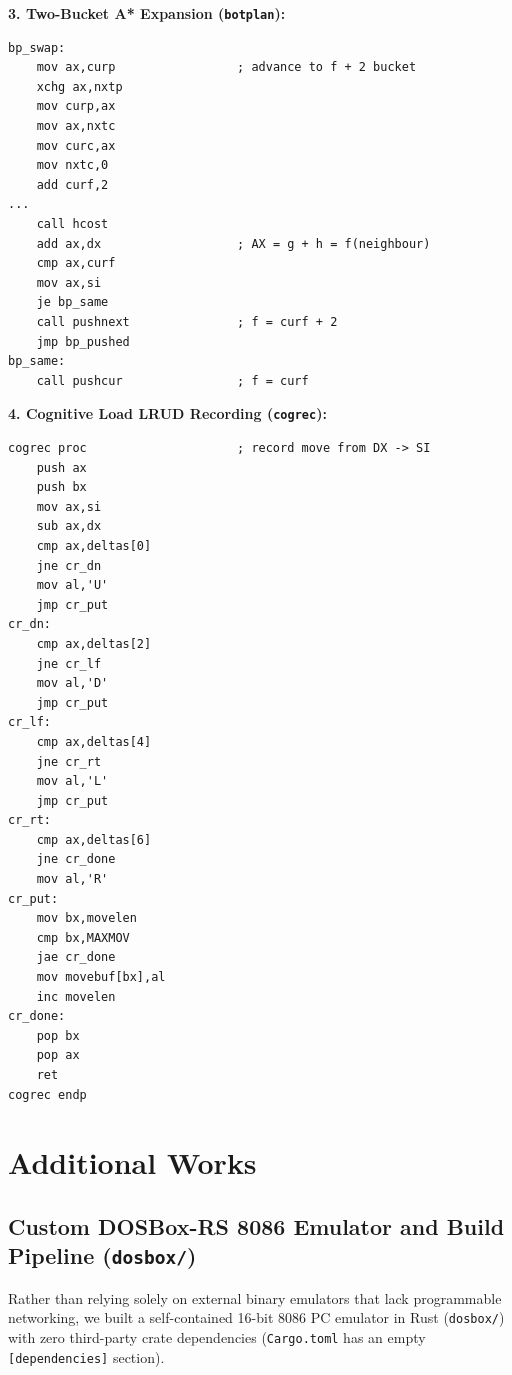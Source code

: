 \documentclass[11pt,a4paper]{article}
\begin{document}
\textbf{3. Two-Bucket A* Expansion (\texttt{botplan}):}
\begin{lstlisting}[caption={Bucket swap and $f / f+2$ neighbor insertion in \texttt{botplan}.}]
bp_swap:
    mov ax,curp                 ; advance to f + 2 bucket
    xchg ax,nxtp
    mov curp,ax
    mov ax,nxtc
    mov curc,ax
    mov nxtc,0
    add curf,2
...
    call hcost
    add ax,dx                   ; AX = g + h = f(neighbour)
    cmp ax,curf
    mov ax,si
    je bp_same
    call pushnext               ; f = curf + 2
    jmp bp_pushed
bp_same:
    call pushcur                ; f = curf
\end{lstlisting}

\textbf{4. Cognitive Load LRUD Recording (\texttt{cogrec}):}
\begin{lstlisting}[caption={Capturing directional moves (\texttt{U/D/L/R}) in cognitive study mode.}]
cogrec proc                     ; record move from DX -> SI
    push ax
    push bx
    mov ax,si
    sub ax,dx
    cmp ax,deltas[0]
    jne cr_dn
    mov al,'U'
    jmp cr_put
cr_dn:
    cmp ax,deltas[2]
    jne cr_lf
    mov al,'D'
    jmp cr_put
cr_lf:
    cmp ax,deltas[4]
    jne cr_rt
    mov al,'L'
    jmp cr_put
cr_rt:
    cmp ax,deltas[6]
    jne cr_done
    mov al,'R'
cr_put:
    mov bx,movelen
    cmp bx,MAXMOV
    jae cr_done
    mov movebuf[bx],al
    inc movelen
cr_done:
    pop bx
    pop ax
    ret
cogrec endp
\end{lstlisting}

\section{Additional Works}

\subsection{Custom DOSBox-RS 8086 Emulator and Build Pipeline (\texttt{dosbox/})}
Rather than relying solely on external binary emulators that lack programmable networking, we built a self-contained 16-bit 8086 PC emulator in Rust (\texttt{dosbox/}) with zero third-party crate dependencies (\texttt{Cargo.toml} has an empty \texttt{[dependencies]} section).
\end{document}
